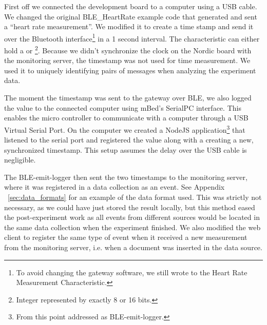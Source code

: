 First off we connected the development board to a computer using a USB cable. We changed the original BLE\_HeartRate example code that generated and sent a ``heart rate measurement''. We modified it to create a time stamp and send it over the Bluetooth interface\footnote{ To avoid changing the gateway software, we still wrote to the Heart Rate Measurement Characteristic.} in a 1 second interval. The characteristic can either hold a  or \footnote{ Integer represented by exactly 8 or 16 bits.}. Because we didn't synchronize the clock on the Nordic board with the monitoring server, the timestamp was not used for time measurement. We used it to uniquely identifying pairs of messages when analyzing the experiment data.

The moment the timestamp was sent to the gateway over BLE, we also logged the value to the connected computer using mBed's SerialPC interface. This enables the micro controller to communicate with a computer through a USB Virtual Serial Port. On the computer we created a NodeJS application\footnote{ From this point addressed as BLE-emit-logger.} that listened to the serial port and registered the value along with a creating a new, synchronized timestamp. This setup assumes the delay over the USB cable is negligible. 

The BLE-emit-logger then sent the two timestamps to the monitoring server, where it was registered in a data collection as an event. See Appendix ~\ref{sec:data_formats} for an example of the data format used. This was strictly not necessary, as we could have just stored the result locally, but this method eased the post-experiment work as all events from different sources would be located in the same data collection when the experiment finished. We also modified the web client to register the same type of event when it received a new measurement from the monitoring server, i.e. when a document was inserted in the data source.

